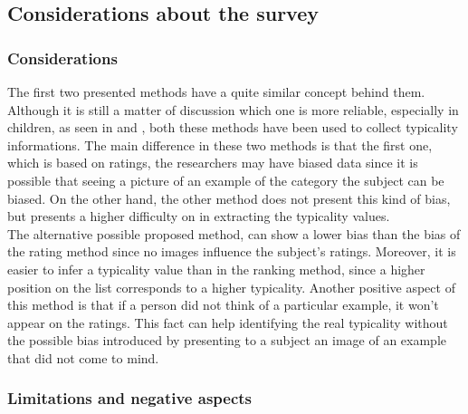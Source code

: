\documentclass[conference]{IEEEtran}
\begin{document}
		\subsection{Considerations about the survey}
		
			\subsubsection{Considerations}
				\noindent The first two presented methods have a quite similar concept behind them. Although it is still a matter of discussion which one is more reliable, especially in children, as seen in \cite{maridaki1997rating} 
				and \cite{10.1371/journal.pone.0157936}, both these methods have been used to collect typicality informations. The main difference in these two methods is that the first one, which is based on 
				ratings, the researchers may have biased data since it is possible that seeing a picture of an example of the category the subject can be biased. On the other hand, the other method does not present 
				this kind of bias, but presents a higher difficulty on in extracting the typicality values. \\
				The alternative possible proposed method, can show a lower bias than the bias of the rating method since no images influence the subject's ratings. Moreover, it is easier to infer a typicality value 
				than in the ranking method, since a higher position on the list corresponds to a higher typicality. 
				Another positive aspect of this method is that if a person did not think of a particular example, it won't appear on the ratings. This fact can help identifying the real typicality 
				without the possible bias introduced by presenting to a subject an image of an example that did not come to mind. 

			\subsubsection{Limitations and negative aspects}
			
\end{document}
